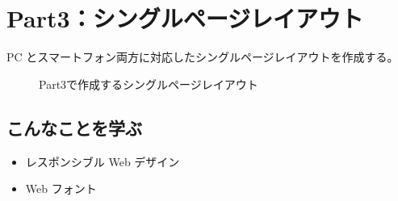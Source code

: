 \section{Part3：シングルページレイアウト}
PC とスマートフォン両方に対応したシングルページレイアウトを作成する。
\vspc{-5.00pt}\begin{figure}[H]\centering{}\caption{Part3で作成するシングルページレイアウト}\label{Part3で作成するシングルページレイアウト}\end{figure}
\subsection*{こんなことを学ぶ}
\begin{itemize}\setlength{\leftskip}{-1.00zw}%
\item レスポンシブル Web デザイン
\item Web フォント
\end{itemize}
